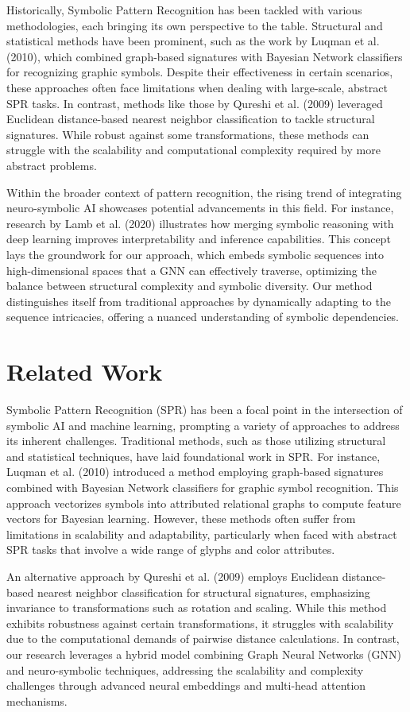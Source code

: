 \documentclass{article}
\begin{document}
Historically, Symbolic Pattern Recognition has been tackled with various methodologies, each bringing its own perspective to the table. Structural and statistical methods have been prominent, such as the work by Luqman et al. (2010), which combined graph-based signatures with Bayesian Network classifiers for recognizing graphic symbols. Despite their effectiveness in certain scenarios, these approaches often face limitations when dealing with large-scale, abstract SPR tasks. In contrast, methods like those by Qureshi et al. (2009) leveraged Euclidean distance-based nearest neighbor classification to tackle structural signatures. While robust against some transformations, these methods can struggle with the scalability and computational complexity required by more abstract problems.

Within the broader context of pattern recognition, the rising trend of integrating neuro-symbolic AI showcases potential advancements in this field. For instance, research by Lamb et al. (2020) illustrates how merging symbolic reasoning with deep learning improves interpretability and inference capabilities. This concept lays the groundwork for our approach, which embeds symbolic sequences into high-dimensional spaces that a GNN can effectively traverse, optimizing the balance between structural complexity and symbolic diversity. Our method distinguishes itself from traditional approaches by dynamically adapting to the sequence intricacies, offering a nuanced understanding of symbolic dependencies.
\section{Related Work}
Symbolic Pattern Recognition (SPR) has been a focal point in the intersection of symbolic AI and machine learning, prompting a variety of approaches to address its inherent challenges. Traditional methods, such as those utilizing structural and statistical techniques, have laid foundational work in SPR. For instance, Luqman et al. (2010) introduced a method employing graph-based signatures combined with Bayesian Network classifiers for graphic symbol recognition. This approach vectorizes symbols into attributed relational graphs to compute feature vectors for Bayesian learning. However, these methods often suffer from limitations in scalability and adaptability, particularly when faced with abstract SPR tasks that involve a wide range of glyphs and color attributes.

An alternative approach by Qureshi et al. (2009) employs Euclidean distance-based nearest neighbor classification for structural signatures, emphasizing invariance to transformations such as rotation and scaling. While this method exhibits robustness against certain transformations, it struggles with scalability due to the computational demands of pairwise distance calculations. In contrast, our research leverages a hybrid model combining Graph Neural Networks (GNN) and neuro-symbolic techniques, addressing the scalability and complexity challenges through advanced neural embeddings and multi-head attention mechanisms.
\end{document}
